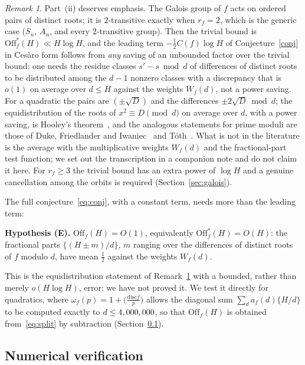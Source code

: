\documentclass[11pt,a4paper]{article}
\theoremstyle{remark}\newtheorem{remark}[theorem]{Remark}
\begin{document}
\begin{remark}\label{rem:two}
Part~(ii) deserves emphasis. The Galois group of $f$ acts on ordered pairs of distinct roots; it is
$2$-transitive exactly when $r_f=2$, which is the generic case ($S_n$, $A_n$, and every $2$-transitive
group). Then the trivial bound is $\mathrm{Off}^\ast_f(H)\ll H\log H$, and the leading term
$-\tfrac12C(f)\log H$ of Conjecture~\ref{conj} in Ces\`aro form follows from \emph{any} saving of an
unbounded factor over the trivial bound: one needs the residue classes $s'-s\bmod d$ of differences of
distinct roots to be distributed among the $d-1$ nonzero classes with a discrepancy that is $o(1)$ on
average over $d\le H$ against the weights $W_f(d)$, not a power saving. For a quadratic the pairs are
$(\pm\sqrt D)$ and the differences $\pm2\sqrt D\bmod d$; the equidistribution of the roots of
$x^2\equiv D\pmod d$ on average over $d$, with a power saving, is Hooley's theorem~\cite{Hooley1963},
and the analogous statements for prime moduli are those of Duke, Friedlander and
Iwaniec~\cite{DFI1995} and T\'oth~\cite{Toth2000}. What is not in the literature is the average with
the multiplicative weights $W_f(d)$ and the fractional-part test function; we set out the transcription
in a companion note and do not claim it here. For $r_f\ge3$ the trivial bound has an extra power of
$\log H$ and a genuine cancellation among the orbits is required (Section~\ref{sec:galois}).
\end{remark}

The full conjecture~\eqref{eq:conj}, with a constant term, needs more than the leading term:

\medskip\noindent\textbf{Hypothesis (E).} $\mathrm{Off}_f(H)=O(1)$, equivalently $\mathrm{Off}^\ast_f(H)=O(H)$:
the fractional parts $\{(H\pm m)/d\}$, $m$ ranging over the differences of distinct roots of $f$
modulo $d$, have mean $\tfrac12$ against the weights $W_f(d)$.

\medskip\noindent
This is the equidistribution statement of Remark~\ref{rem:two} with a bounded, rather than merely
$o(H\log H)$, error; we have not proved it. We test it directly for quadratics, where $\omega_f(p)=1+\bigl(\frac{\mathrm{disc}f}{p}\bigr)$
allows the diagonal sum $\sum_d a_f(d)\{H/d\}$ to be computed exactly to $d\le4,000,000$, so that
$\mathrm{Off}_f(H)$ is obtained from~\eqref{eq:split} by subtraction (Section~\ref{sec:sumnum}).

\subsection{Numerical verification}\label{sec:sumnum}
\end{document}
